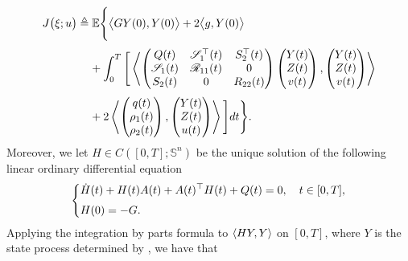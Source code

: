 \documentclass[11pt,times,twoside]{article}
\def\dbE{\mathbb{E}} \def\sE{\mathscr{E}} \def\fE{\mathfrak{E}} \def\cE{{\cal E}} \def\BE{{\bf E}} \def\Be{{\bf e}}
\def\dbS{\mathbb{S}} \def\sS{\mathscr{S}} \def\fS{\mathfrak{S}} \def\cS{{\cal S}} \def\BS{{\bf S}} \def\Bs{{\bf s}}
\def\ba{\begin{aligned}}              \def\ea{\end{aligned}}
\begin{document}
\begin{align}\label{4.23}
\ds J\big(\xi;u\big)
&\deq\dbE\Bigg\{\big\lan GY(0),Y(0)\big\ran+2\big\lan g,Y(0)\big\ran \nonumber\\
%
\ns\ds &\hp{=\ } +\int_0^T\Bigg[
\llan\begin{pmatrix}Q(t)&\mathscr{S}_1^\top(t)&S_2^\top(t)\\\mathscr{S}_1(t)&\mathscr{R}_{11}(t)&0
\\S_2(t)&0&R_{22}(t) \end{pmatrix}
\begin{pmatrix}Y(t)\\Z(t)\\v(t)\end{pmatrix},
\begin{pmatrix}Y(t)\\Z(t)\\v(t)\end{pmatrix}\rran \\
%
\ns\ds &\hp{=\ }  +2\llan\begin{pmatrix}q(t)\\ \rho_1(t)\\ \rho_2(t) \end{pmatrix},
   \begin{pmatrix}Y(t)\\Z(t)\\u(t)\end{pmatrix}\rran\Bigg] dt\Bigg\}. \nonumber
%
\end{align}
%
Moreover, we let $H\in C([0,T];\dbS^n)$ be the unique solution of the following linear ordinary differential equation
%
\begin{equation*}\left\{\ba
\ds & \dot{H}(t)+H(t) A(t)+A(t)^{\top} H(t)+Q(t)=0, \q  t \in[0,T], \\
\ns\ds & H(0)=-G.
\ea\right.
\end{equation*}
%
Applying the integration by parts formula to $\langle HY,Y\rangle$ on $[0,T]$, where $Y$ is the state process determined by , we have that
%
\end{document}

